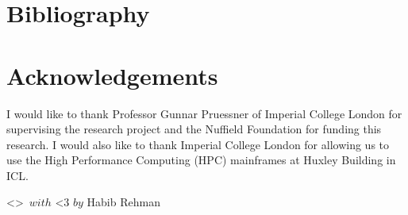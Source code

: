 \documentclass{article}
\begin{document}
\section{Bibliography}
	
	
\hphantom
\newline
\section{Acknowledgements}
I would like to thank Professor Gunnar Pruessner of Imperial College London for supervising the research project and the Nuffield Foundation for funding this research. I would also like to thank Imperial College London for allowing us to use the High Performance Computing (HPC) mainframes at Huxley Building in ICL.

\hphantom
\newline
\textless\textgreater\ $with$ \textless3 $by$ Habib Rehman
\end{document}
